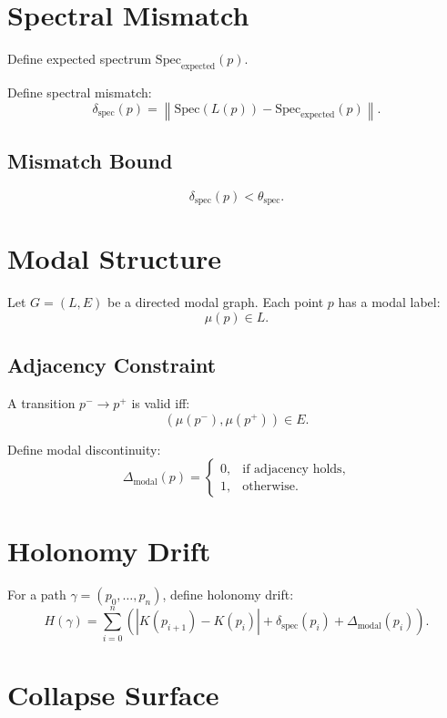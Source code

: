 \documentclass[11pt]{article}
\begin{document}
\section{Spectral Mismatch}

Define expected spectrum $\mathrm{Spec}_{\mathrm{expected}}(p)$.

Define spectral mismatch:
\[
\delta_{\mathrm{spec}}(p)
  = \left\| \mathrm{Spec}(L(p))
           - \mathrm{Spec}_{\mathrm{expected}}(p)
    \right\|.
\]

\subsection{Mismatch Bound}
\[
\delta_{\mathrm{spec}}(p) < \theta_{\mathrm{spec}}.
\]

\section{Modal Structure}

Let $G = (L, E)$ be a directed modal graph. Each point $p$ has a modal label:
\[
\mu(p) \in L.
\]

\subsection{Adjacency Constraint}
A transition $p^- \to p^+$ is valid iff:
\[
(\mu(p^-), \mu(p^+)) \in E.
\]

Define modal discontinuity:
\[
\Delta_{\mathrm{modal}}(p)
  = \begin{cases}
      0, & \text{if adjacency holds}, \\
      1, & \text{otherwise}.
    \end{cases}
\]

\section{Holonomy Drift}

For a path $\gamma = (p_0, \ldots, p_n)$, define holonomy drift:
\[
H(\gamma)
  = \sum_{i=0}^{n}
      \left(
        |K(p_{i+1}) - K(p_i)|
        + \delta_{\mathrm{spec}}(p_i)
        + \Delta_{\mathrm{modal}}(p_i)
      \right).
\]

\section{Collapse Surface}
\end{document}
